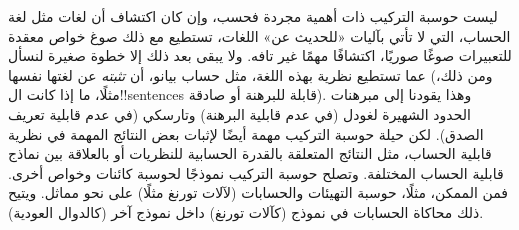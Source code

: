 \documentclass[../../../include/open-logic-section]{subfiles}
\begin{document}
ليست حوسبة التركيب ذات أهمية مجردة فحسب، وإن كان اكتشاف أن لغات مثل
لغة الحساب، التي لا تأتي بآليات «للحديث عن» اللغات، تستطيع مع ذلك
صوغ خواص معقدة للتعبيرات صوغًا صوريًا، اكتشافًا مهمًا غير تافه. ولا
يبقى بعد ذلك إلا خطوة صغيرة لنسأل عما تستطيع نظرية بهذه اللغة، مثل
حساب بيانو، أن \emph{تثبته} عن لغتها نفسها (ومن ذلك، مثلًا، ما إذا
كانت ال!!{sentence}s قابلة للبرهنة أو صادقة). وهذا يقودنا إلى
مبرهنات الحدود الشهيرة لغودل (في عدم قابلية البرهنة) وتارسكي (في عدم
قابلية تعريف الصدق). لكن حيلة حوسبة التركيب مهمة أيضًا لإثبات بعض
النتائج المهمة في نظرية قابلية الحساب، مثل النتائج المتعلقة بالقدرة
الحسابية للنظريات أو بالعلاقة بين نماذج قابلية الحساب المختلفة.
وتصلح حوسبة التركيب نموذجًا لحوسبة كائنات وخواص أخرى. فمن الممكن،
مثلًا، حوسبة التهيئات والحسابات (لآلات تورنغ مثلًا) على نحو مماثل.
ويتيح ذلك محاكاة الحسابات في نموذج (كآلات تورنغ) داخل نموذج آخر
(كالدوال العودية).
\end{document}
